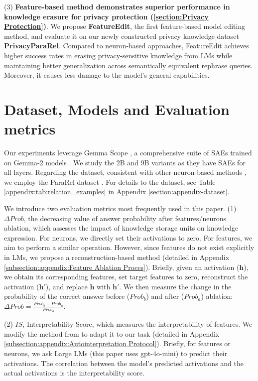 (3) \textbf{Feature-based method demonstrates superior performance in knowledge erasure for privacy protection (\textbf{\textsection\ref{section:Privacy Protection}})}. 
We propose \textbf{FeatureEdit}, the first feature-based model editing method, and evaluate it on our newly constructed privacy knowledge dataset \textbf{PrivacyParaRel}. Compared to neuron-based approaches, FeatureEdit achieves higher success rates in erasing privacy-sensitive knowledge from LMs while maintaining better generalization across semantically equivalent rephrase queries. Moreover, it causes less damage to the model's general capabilities.




\section{Dataset, Models and Evaluation metrics}
\label{section:Dataset, Models and Evaluation metrics}
Our experiments leverage Gemma Scope \citep{lieberum-etal-2024-gemma}, a comprehensive suite of SAEs trained on Gemma-2 models \citep{gemmateam2024gemma2improvingopen}. We study the 2B and 9B variants as they have SAEs for all layers.  Regarding the dataset, consistent with other neuron-based methods \citep{dai2022knowledge, chen2024journey}, we employ the ParaRel dataset \citep{elazar2021measuring-dataset}. For details to the dataset, see Table \ref{appendix:tab:relation_examples} in Appendix \ref{section:appendix-dataset}.

We introduce two evaluation metrics most frequently used in this paper. (1) $\Delta Prob$, the decreasing value of answer probability after features/neurons ablation, which assesses the impact of knowledge storage units on knowledge expression. For neurons, we directly set their activations to zero. For features, we aim to perform a similar operation. However, since features do not exist explicitly in LMs, we propose a reconstruction-based method (detailed in Appendix \ref{subsection:appendix:Feature Ablation Proces}). Briefly, given an activation ($\mathbf{h}$), we obtain its corresponding features, set target features to zero, reconstruct the activation ($\mathbf{h}'$), and replace $\mathbf{h}$ with $\mathbf{h}'$. We then measure the change in the probability of the correct answer before ($Prob_b$) and after ($Prob_a$) ablation: $\Delta Prob = \frac{Prob_b - Prob_a}{Prob_b}$.

(2) $IS$, Interpretability Score, which measures the interpretability of features. We  modify the method from \citet{bills2023language} to adapt it to our task (detailed in Appendix \ref{subsection:appendix:Autointerpretation Protocol}). Briefly, for features or neurons, we ask Large LMs (this paper uses gpt-4o-mini) to predict their activations. The correlation between the model's predicted activations and the actual activations is the interpretability score.



